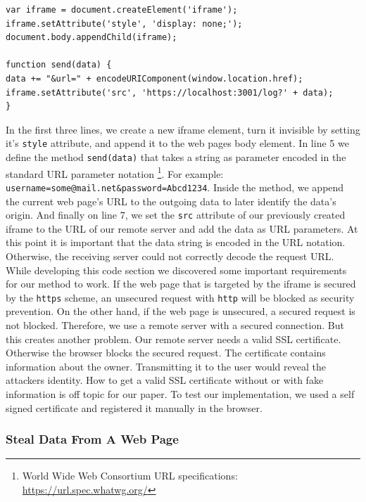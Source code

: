 \begin{lstlisting}
var iframe = document.createElement('iframe');
iframe.setAttribute('style', 'display: none;');
document.body.appendChild(iframe);

function send(data) {
data += "&url=" + encodeURIComponent(window.location.href);
iframe.setAttribute('src', 'https://localhost:3001/log?' + data);
}
\end{lstlisting}

In the first three lines, we create a new iframe element, turn it invisible by setting it's \texttt{style} attribute, and append it to the web pages body element. In line 5 we define the method \texttt{send(data)} that takes a string as parameter encoded in the standard URL parameter notation \footnote{World Wide Web Consortium URL specifications:
	 \url{https://url.spec.whatwg.org/}}. For example: \texttt{username=some@mail.net\&password=Abcd1234}. Inside the method, we append the current web page's URL to the outgoing data to later identify the data's origin. And finally on line 7, we set the \texttt{src} attribute of our previously created iframe to the URL of our remote server and add the data as URL parameters. At this point it is important that the data string is encoded in the URL notation. Otherwise, the receiving server could not correctly decode the request URL. \\


While developing this code section we discovered some important requirements for our method to work. If the web page that is targeted by the iframe is secured by the \texttt{https} scheme, an unsecured request with \texttt{http} will be blocked as security prevention. On the other hand, if the web page is unsecured, a secured request is not blocked. Therefore, we use a remote server with a secured connection. But this creates another problem. Our remote server needs a valid SSL certificate. Otherwise the browser blocks the secured request. The certificate contains information about the owner. Transmitting it to the user would reveal the attackers identity. How to get a valid SSL certificate without or with fake information is off topic for our paper. To test our implementation, we used a self signed certificate and registered it manually in the browser. \\

\subsubsection{Steal Data From A Web Page}

